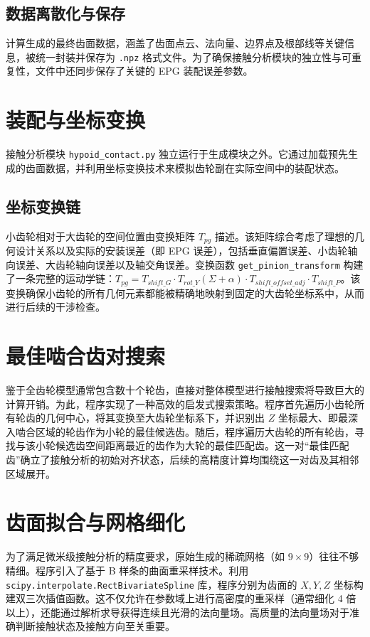 \documentclass[UTF8]{ctexart}
\begin{document}
\subsection{数据离散化与保存}
计算生成的最终齿面数据，涵盖了齿面点云、法向量、边界点及根部线等关键信息，被统一封装并保存为 \texttt{.npz} 格式文件。为了确保接触分析模块的独立性与可重复性，文件中还同步保存了关键的 EPG 装配误差参数。

\section{装配与坐标变换}
接触分析模块 \texttt{hypoid\_contact.py} 独立运行于生成模块之外。它通过加载预先生成的齿面数据，并利用坐标变换技术来模拟齿轮副在实际空间中的装配状态。

\subsection{坐标变换链}
小齿轮相对于大齿轮的空间位置由变换矩阵 $T_{pg}$ 描述。该矩阵综合考虑了理想的几何设计关系以及实际的安装误差（即 EPG 误差），包括垂直偏置误差、小齿轮轴向误差、大齿轮轴向误差以及轴交角误差。变换函数 \texttt{get\_pinion\_transform} 构建了一条完整的运动学链：$T_{pg} = T_{shift\_G} \cdot T_{rot\_Y}(\Sigma + \alpha) \cdot T_{shift\_offset\_adj} \cdot T_{shift\_P}$。该变换确保小齿轮的所有几何元素都能被精确地映射到固定的大齿轮坐标系中，从而进行后续的干涉检查。

\section{最佳啮合齿对搜索}
鉴于全齿轮模型通常包含数十个轮齿，直接对整体模型进行接触搜索将导致巨大的计算开销。为此，程序实现了一种高效的启发式搜索策略。程序首先遍历小齿轮所有轮齿的几何中心，将其变换至大齿轮坐标系下，并识别出 $Z$ 坐标最大、即最深入啮合区域的轮齿作为小轮的最佳候选齿。随后，程序遍历大齿轮的所有轮齿，寻找与该小轮候选齿空间距离最近的齿作为大轮的最佳匹配齿。这一对“最佳匹配齿”确立了接触分析的初始对齐状态，后续的高精度计算均围绕这一对齿及其相邻区域展开。

\section{齿面拟合与网格细化}
为了满足微米级接触分析的精度要求，原始生成的稀疏网格（如 $9 \times 9$）往往不够精细。程序引入了基于 B 样条的曲面重采样技术。利用 \texttt{scipy.interpolate.RectBivariateSpline} 库，程序分别为齿面的 $X, Y, Z$ 坐标构建双三次插值函数。这不仅允许在参数域上进行高密度的重采样（通常细化 4 倍以上），还能通过解析求导获得连续且光滑的法向量场。高质量的法向量场对于准确判断接触状态及接触方向至关重要。
\end{document}
